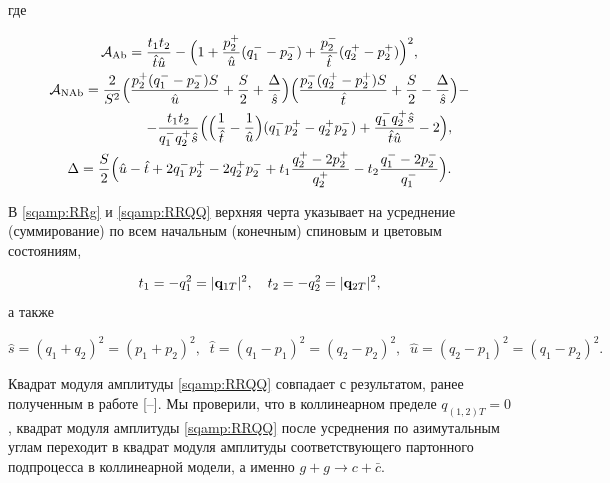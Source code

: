 где

\begin{gather}

{\cal A}_{\mathrm{Ab}} = \frac{t_1 t_2}{{\hat t} {\hat u}} - \Bigl( 1 + \frac{p_2^+}{{\hat

u}}(q_1^--p_2^-)+\frac{p_2^-}{{\hat t}}(q_2^+-p_2^+) \Bigr)^2,

\\

{\cal A}_{\mathrm{NAb}} = \frac{2}{S^2}

\Bigl(\frac{p_2^+ (q_1^--p_2^-)S}{{\hat u}}+\frac{S}{2}+\frac{\Delta}{\hat

s}\Bigr)\Bigl(\frac{p_2^- (q_2^+-p_2^+)S}{{\hat t}}+\frac{S}{2}-\frac{\Delta}{\hat s}\Bigr) -

\\

\hspace{2cm}

-\frac{t_1 t_2}{q_1^- q_2^+ {\hat s}}

\Bigl(\Bigl(\frac{1}{{\hat t}}-\frac{1}{{\hat u}}\Bigr)(q_1^- p_2^+ - q_2^+

p_2^-)+\frac{q_1^- q_2^+ {\hat s}}{{\hat t} {\hat u}}-2\Bigr),

\\

\Delta = \frac{S}{2}

\Bigl({\hat u} - {\hat t}+2 q_1^- p_2^+-2

q_2^+ p_2^- +t_1 \frac{q_2^+-2 p_2^+}{q_2^+}  -t_2 \frac{q_1^--2

p_2^-}{q_1^-} \Bigr).

\end{gather}

В \eqref{sqamp:RRg} и \eqref{sqamp:RRQQ} верхняя черта указывает на усреднение (суммирование) по всем начальным (конечным) спиновым и цветовым состояниям, 

$$t_1 = - q_1^2 = |{\bf q}_{1T}|^2,\quad t_2 = - q_2^2= |{\bf q}_{2T}|^2,$$ а также

$$

\hat s = (q_1 + q_2)^2 = (p_1 + p_2)^2, \; \;

\hat t = (q_1 - p_1)^2 = (q_2 - p_2)^2, \; \;

\hat u = (q_2 - p_1)^2 = (q_1 - p_2)^2.

$$

Квадрат модуля амплитуды \eqref{sqamp:RRQQ} совпадает с результатом, ранее полученным в работе [--]. Мы проверили, что в коллинеарном пределе $q_{(1,2)T}=0$, квадрат модуля амплитуды \eqref{sqamp:RRQQ} после усреднения по азимутальным углам переходит в квадрат модуля амплитуды соответствующего партонного подпроцесса в коллинеарной модели, а именно $g+g\to c+\bar c$. 

